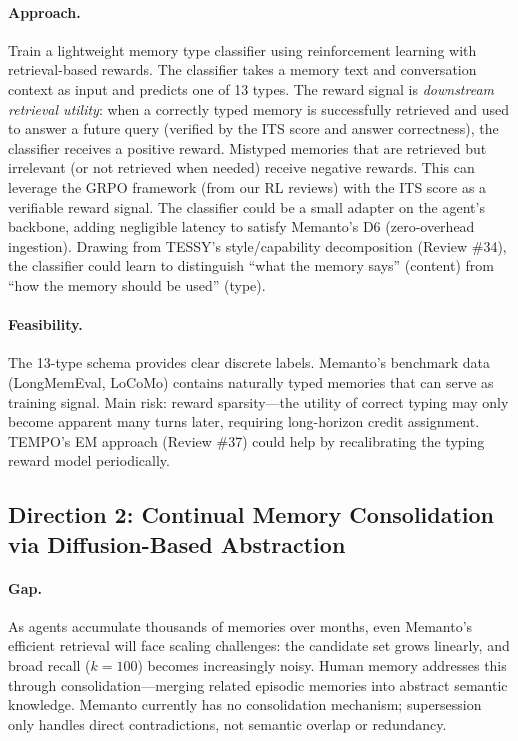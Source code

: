 \documentclass[11pt]{article}
\begin{document}
\paragraph{Approach.}
Train a lightweight memory type classifier using reinforcement learning with retrieval-based rewards. The classifier takes a memory text and conversation context as input and predicts one of 13 types. The reward signal is \emph{downstream retrieval utility}: when a correctly typed memory is successfully retrieved and used to answer a future query (verified by the ITS score and answer correctness), the classifier receives a positive reward. Mistyped memories that are retrieved but irrelevant (or not retrieved when needed) receive negative rewards. This can leverage the GRPO framework (from our RL reviews) with the ITS score as a verifiable reward signal. The classifier could be a small adapter on the agent's backbone, adding negligible latency to satisfy Memanto's D6 (zero-overhead ingestion). Drawing from TESSY's style/capability decomposition (Review \#34), the classifier could learn to distinguish ``what the memory says'' (content) from ``how the memory should be used'' (type).

\paragraph{Feasibility.}
The 13-type schema provides clear discrete labels. Memanto's benchmark data (LongMemEval, LoCoMo) contains naturally typed memories that can serve as training signal. Main risk: reward sparsity---the utility of correct typing may only become apparent many turns later, requiring long-horizon credit assignment. TEMPO's EM approach (Review \#37) could help by recalibrating the typing reward model periodically.

\subsection{Direction 2: Continual Memory Consolidation via Diffusion-Based Abstraction}

\paragraph{Gap.}
As agents accumulate thousands of memories over months, even Memanto's efficient retrieval will face scaling challenges: the candidate set grows linearly, and broad recall ($k{=}100$) becomes increasingly noisy. Human memory addresses this through consolidation---merging related episodic memories into abstract semantic knowledge. Memanto currently has no consolidation mechanism; supersession only handles direct contradictions, not semantic overlap or redundancy.
\end{document}
